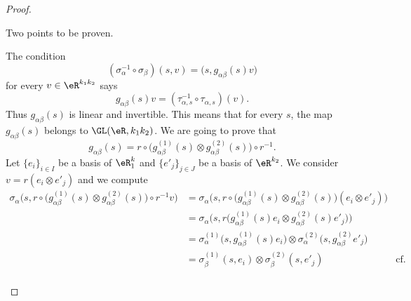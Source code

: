 \begin{proof}
\begin{subproof}
		Two points to be proven.
		\begin{subproof}
			The condition
			\begin{equation}
				(\sigma_{\alpha}^{-1}\circ\sigma_{\beta})(s,v)=\big( s,g_{\alpha\beta}(s)v \big)
			\end{equation}
			for every \( v\in \eR^{k_1k_2}\) says
			\begin{equation}
				g_{\alpha\beta}(s)v=(\tau_{\alpha,s}^{-1}\circ\tau_{\alpha,s})(v).
			\end{equation}
			Thus \( g_{\alpha\beta}(s)\) is linear and invertible. This means that for every \( s\), the map \( g_{\alpha\beta}(s)\) belongs to \(\GL(\eR, k_1k_2)\).
			We are going to prove that
			\begin{equation}\label{EQooAUMXooCoqPTO}
				g_{\alpha\beta}(s)=r\circ\big( g_{\alpha\beta}^{(1)}(s)\otimes g_{\alpha\beta}^{(2)}(s) \big)\circ r^{-1}.
			\end{equation}
			Let \( \{ e_i \}_{i\in I}\) be a basis of \( \eR^k_1\) and \( \{ e'_j \}_{j\in J}\) be a basis of \( \eR^{k_2}\). We consider \( v=r(e_i\otimes e'_j)\) and we compute
			\begin{subequations}		\label{EQSooUIMFooMBbBvp}
				\begin{align}
					\sigma_{\alpha}\Big( s,  r\circ\big( g_{\alpha\beta}^{(1)}(s)\otimes g_{\alpha\beta}^{(2)}(s) \big)\circ r^{-1}v \Big)
					 & =\sigma_{\alpha}\Big(  s, r\circ\big( g_{\alpha\beta}^{(1)}(s)\otimes g_{\alpha\beta}^{(2)}(s) \big)(e_i\otimes e'_j)   \Big)                                                          \\
					 & =\sigma_{\alpha}\Big( s,r\big( g_{\alpha\beta}^{(1)}(s)e_i\otimes g_{\alpha\beta}^{(2)}(s)e'_j \big) \Big)                                                                             \\
					 & = \sigma_{\alpha}^{(1)}\big( s,g_{\alpha\beta}^{(1)}(s)e_i \big)\otimes \sigma_{\alpha}^{(2)}\big( s,g_{\alpha\beta}^{(2)}e'_j \big)                                                   \\
					 & = \sigma_{\beta}^{(1)}(s,e_i)\otimes \sigma_{\beta}^{(2)}(s,e'_j)                                                                    & \text{cf. justif.}  \label{SUBEQooSZDEooLQBGoQ} \\

\end{align}
\end{subequations}
\end{subproof}
\end{subproof}
\end{proof}
